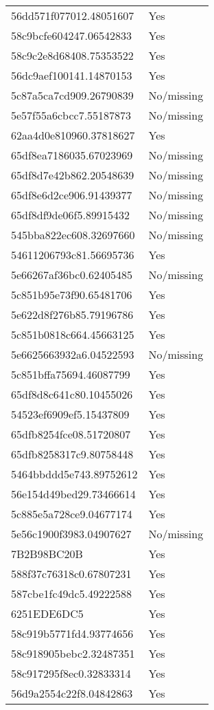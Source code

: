 \begin{tabular}{ll}
56dd571f077012.48051607 & Yes \\
58c9bcfe604247.06542833 & Yes \\
58c9c2e8d68408.75353522 & Yes \\
56dc9aef100141.14870153 & Yes \\
5c87a5ca7cd909.26790839 & No/missing \\
5e57f55a6cbcc7.55187873 & No/missing \\
62aa4d0e810960.37818627 & Yes \\
65df8ea7186035.67023969 & No/missing \\
65df8d7e42b862.20548639 & No/missing \\
65df8e6d2ce906.91439377 & No/missing \\
65df8df9de06f5.89915432 & No/missing \\
545bba822ec608.32697660 & No/missing \\
54611206793c81.56695736 & Yes \\
5e66267af36bc0.62405485 & No/missing \\
5c851b95e73f90.65481706 & Yes \\
5e622d8f276b85.79196786 & Yes \\
5c851b0818c664.45663125 & Yes \\
5e6625663932a6.04522593 & No/missing \\
5c851bffa75694.46087799 & Yes \\
65df8d8c641c80.10455026 & Yes \\
54523ef6909ef5.15437809 & Yes \\
65dfb8254fce08.51720807 & Yes \\
65dfb8258317c9.80758448 & Yes \\
5464bbddd5e743.89752612 & Yes \\
56e154d49bed29.73466614 & Yes \\
5c885e5a728ce9.04677174 & Yes \\
5e56c1900f3983.04907627 & No/missing \\
7B2B98BC20B & Yes \\
588f37c76318c0.67807231 & Yes \\
587cbe1fc49dc5.49222588 & Yes \\
6251EDE6DC5 & Yes \\
58c919b5771fd4.93774656 & Yes \\
58c918905bebc2.32487351 & Yes \\
58c917295f8ec0.32833314 & Yes \\
56d9a2554c22f8.04842863 & Yes \\

\end{tabular}
